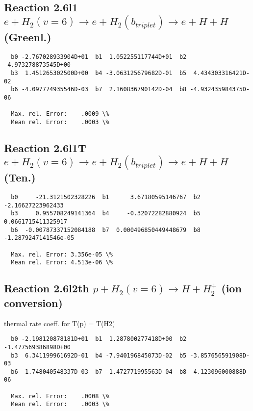 \documentclass[12pt,dvipdfmx]{article}
\begin{document}
\newpage
\subsection{
Reaction 2.6l1
$ e + H_2(v=6) \rightarrow e +  H_2(b_{triplet}) \rightarrow e + H + H $ (Greenl.)
}


\begin{small}\begin{verbatim}
  b0 -2.767028933904D+01  b1  1.052255117744D+01  b2 -4.973278873545D+00
  b3  1.451265302500D+00  b4 -3.063125679682D-01  b5  4.434303316421D-02
  b6 -4.097774935546D-03  b7  2.160836790142D-04  b8 -4.932435984375D-06

  Max. rel. Error:    .0009 \%
  Mean rel. Error:    .0003 \%

\end{verbatim}\end{small}


\subsection{
Reaction 2.6l1T
$  e + H_2(v=6) \rightarrow e +  H_2(b_{triplet}) \rightarrow e + H + H $ (Ten.)
}


\begin{small}\begin{verbatim}
  b0     -21.3121502328226  b1      3.67180595146767  b2     -2.16627223962433
  b3     0.955708249141364  b4     -0.32072282880924  b5    0.0661715411325917
  b6  -0.00787337152084188  b7  0.000496850449448679  b8  -1.2879247141546e-05

  Max. rel. Error: 3.356e-05 \%
  Mean rel. Error: 4.513e-06 \%
\end{verbatim}\end{small}


\subsection{
Reaction 2.6l2th
$ p + H_2(v=6) \rightarrow H + H_2^+$ (ion conversion)
}
thermal rate coeff. for T(p) = T(H2)

\begin{small}\begin{verbatim}
  b0 -2.198120878181D+01  b1  1.287800277418D+00  b2 -1.477569386898D+00
  b3  6.341199961692D-01  b4 -7.940196845073D-02  b5 -3.857656591908D-03
  b6  1.748040548337D-03  b7 -1.472771995563D-04  b8  4.123096000888D-06

  Max. rel. Error:    .0008 \%
  Mean rel. Error:    .0003 \%
\end{verbatim}\end{small}
\end{document}
